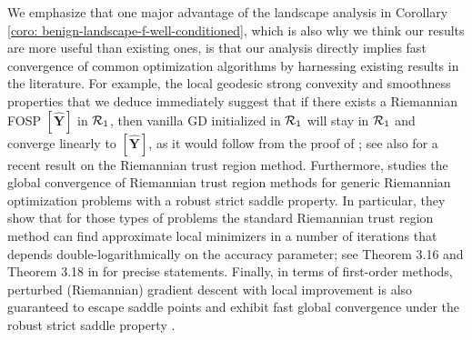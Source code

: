 \documentclass[11pt]{article}
\newcommand{\0}{{\mathbf{0}}}
\newcommand{\1}{{\mathbf{1}}}
\newcommand{\Y}{{\mathbf{Y}}}
\newcommand{\cR}{{\cal R}}
\begin{document}
{We emphasize that one major advantage of the landscape analysis in Corollary \ref{coro: benign-landscape-f-well-conditioned}, which is also why we think our results are more useful than existing ones, is that our analysis directly implies fast convergence of common optimization algorithms by harnessing existing results in the literature. For example, the local geodesic strong convexity and smoothness properties that we deduce immediately suggest that if there exists a Riemannian FOSP $[\widehat{\Y}]$ in $\cR_1$, then vanilla GD initialized in $\cR_1$ will stay in $\cR_1$ and converge linearly to $[\widehat{\Y}]$, as it would follow from the proof of \cite[Theorem 11.29]{boumal2020introduction}; see also \cite[Proposition 3.14]{goyens2024riemannian} for a recent result on the Riemannian trust region method. Furthermore, \cite{goyens2024riemannian} studies the global convergence of Riemannian trust region methods for generic Riemannian optimization problems with a robust strict saddle property. In particular, they show that for those types of problems the standard Riemannian trust region method can find approximate local minimizers in a number of iterations that depends double-logarithmically on the accuracy parameter; see Theorem 3.16 and Theorem 3.18 in \cite{goyens2024riemannian} for precise statements. Finally, in terms of first-order methods, perturbed (Riemannian) gradient descent with local improvement is also guaranteed to escape saddle points and exhibit fast global convergence under the robust strict saddle property \cite{ge2015escaping,jin2017escape,sun2019escaping,criscitiello2019efficiently}. 

}
\end{document}
